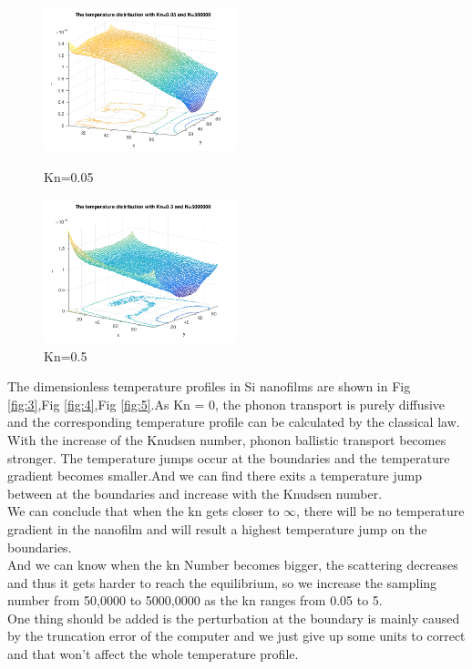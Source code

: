 \begin{figure}
\begin{minipage}[t]{0.5\linewidth}
\centering
\includegraphics[width=2.2in]{6.png}
\caption{Kn=0.05}
\label{fig:6}
\end{minipage}%
\begin{minipage}[t]{0.5\linewidth}
\centering
\includegraphics[width=2.2in]{7.png}
\caption{Kn=0.5}
\label{fig:7}
\end{minipage}
\end{figure}

The dimensionless temperature profiles in Si nanofilms are shown in Fig \ref{fig:3},Fig \ref{fig:4},Fig \ref{fig:5}.As Kn = 0, the phonon transport is purely diffusive and the corresponding temperature profile can be calculated by the classical   law. With the increase of the Knudsen number, phonon ballistic transport becomes stronger.
The temperature jumps occur at the boundaries and the temperature
gradient becomes smaller.And we can find there exits a temperature jump between at the boundaries and increase with the Knudsen number.\\
\indent We can conclude that when the kn gets closer to $\infty$, there will be no temperature gradient in the nanofilm and will result a highest temperature jump on the boundaries.\\
\indent And we can know when the kn Number becomes bigger, the scattering decreases and thus it gets harder to reach the equilibrium, so we increase the sampling number from 50,0000 to 5000,0000 as the kn ranges from 0.05 to 5.\\
\indent One thing should be added is the perturbation at the boundary is mainly caused by the truncation error of the computer and we just give up some units to correct and that won't affect the whole temperature profile.





